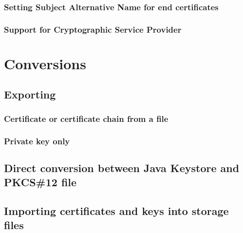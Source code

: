 \documentclass[10pt, a4paper]{report}
\begin{document}
    \subsubsection{Setting Subject Alternative Name for end certificates}
    
    \subsubsection{Support for Cryptographic Service Provider}
    
\section{Conversions}

  \subsection{Exporting}
  
    \subsubsection{Certificate or certificate chain from a file}
    
    \subsubsection{Private key only}
    
  \subsection{Direct conversion between Java Keystore and PKCS\#12 file}
  
  \subsection{Importing certificates and keys into storage files}
  
\end{document}
